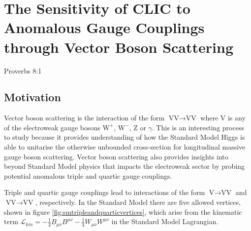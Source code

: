\chapter{The Sensitivity of CLIC to Anomalous Gauge Couplings through Vector Boson Scattering}
\label{chap:PhysicsAnalysis}

%
{Proverbs 8:1}


\section{Motivation}
Vector boson scattering is the interaction of the form $\text{VV} \rightarrow \text{VV}$ where V is any of the electroweak gauge bosons $\text{W}^{+}$, $\text{W}^{-}$, Z or $\gamma$.  This is an interesting process to study because it provides understanding of how the Standard Model Higgs is able to unitarise the otherwise unbounded cross-section for longitudinal massive gauge boson scattering.  Vector boson scattering also provides insights into beyond Standard Model physics that impacts the electroweak sector by probing potential anomalous triple and quartic gauge couplings.  

Triple and quartic gauge couplings lead to interactions of the form $\text{V} \rightarrow \text{VV}$ and $\text{VV} \rightarrow \text{VV}$\textcolor{blue}{,} respectively.  In the Standard Model there are five allowed vertices, shown in figure \ref{fig:smtripleandquarticvertices}, which arise from the kinematic term $\mathcal{L}_{kin} = -\frac{1}{4}B_{\mu\nu}B^{\mu\nu} - \frac{1}{4}W_{\mu\nu}W^{\mu\nu}$ in the Standard Model Lagrangian.

